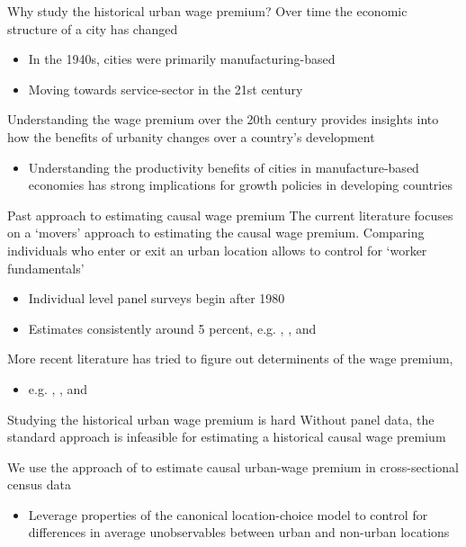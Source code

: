 \documentclass[aspectratio=169,t]{beamer}
\begin{document}
\begin{frame}{Why study the historical urban wage premium?}
  Over time the economic structure of a city has changed 
  \begin{itemize}
    \item In the 1940s, cities were primarily manufacturing-based
    
    \item Moving towards service-sector in the 21st century \citep{Diamond_2016}
  \end{itemize}

  \bigskip
  Understanding the wage premium over the 20th century provides insights into how the benefits of urbanity changes over a country's development
  \pause
  \begin{itemize}
    \item Understanding the productivity benefits of cities in manufacture-based economies has strong implications for growth policies in developing countries
  \end{itemize}
\end{frame}

\begin{frame}{Past approach to estimating causal wage premium}
  The current literature focuses on a `movers' approach to estimating the causal wage premium. 
  Comparing individuals who enter or exit an urban location allows to control for `worker fundamentals'
  \begin{itemize}
    \item Individual level panel surveys begin after 1980

    \item Estimates consistently around 5 percent, 
    {\small e.g. \citet{Glaeser_Mare_2001}, \citet{Yankow_2006}, and \citet{BaumSnow_Pavan_2012}}
  \end{itemize}

  \bigskip
  More recent literature has tried to figure out determinents of the wage premium,
  \begin{itemize}
    \item {\small e.g. \citet{DCosta_Overman_2014}, \citet{card2024location}, and \citet{ananat2018race}}
  \end{itemize}
\end{frame}

\begin{frame}{Studying the historical urban wage premium is hard}
  Without panel data, the standard approach is infeasible for estimating a historical causal wage premium

  \bigskip
  We use the approach of \citet{altonji2018estimating} to estimate causal urban-wage premium in cross-sectional census data
  \begin{itemize}
    \item Leverage properties of the canonical location-choice model to control for differences in average unobservables between urban and non-urban locations
  \end{itemize}
\end{frame}
\end{document}
